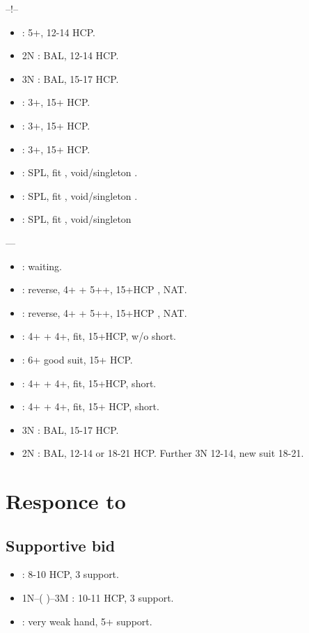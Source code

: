 \documentclass[12pt,twoside,a5paper]{report}%
\begin{document}
	--!--
	\begin{itemize}
	\renewcommand{\labelitemi}{}
	\item {} : 5+\di{}, 12-14 HCP.
	\item 2N : BAL, 12-14 HCP.
	\item 3N : BAL, 15-17 HCP.
	\item {} : 3+\he{}, 15+ HCP.
	\item {} : 3+\sp{}, 15+ HCP.
	\item {} : 3+\cl{}, 15+ HCP.
	\item {} : SPL, fit \di{}, void/singleton \he{}.
	\item {} : SPL, fit \di{}, void/singleton \sp{}.
	\item {} : SPL, fit \di{}, void/singleton \cl{}
	\end{itemize}

	----
	\begin{itemize}
	\renewcommand{\labelitemi}{}
	\item {} : waiting.
	\item {} : reverse, 4+\he{} + 5+\di{}+, 15+HCP , NAT.
	\item {} : reverse, 4+\sp{} + 5+\di{}+, 15+HCP , NAT.
	\item {} :  4+\di{} + 4+\cl{}, fit, 15+HCP, w/o short.
	\item {} : 6+\di{} good suit, 15+ HCP.
	\item {} : 4+\di{} + 4+\cl{}, fit, 15+HCP, short\he{}.
	\item {} : 4+\di{} + 4+\cl{}, fit, 15+ HCP, short\sp{}.
	\item 3N : BAL, 15-17 HCP.
	\item 2N : BAL, 12-14 or 18-21 HCP. Further 3N 12-14, new suit 18-21.
	\end{itemize}

	\chapter*{Responce to }
	
	\section*{Supportive bid}
	\begin{itemize}
	\renewcommand{\labelitemi}{}
	\item {} : 8-10 HCP, 3\he{} support.
	\item 1N--( )--3M : 10-11 HCP, 3\he{} support.
	\item {} : very weak hand, 5+\he{} support.
	\end{itemize}
\end{document}
